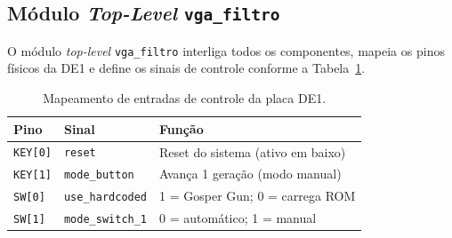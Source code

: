 \documentclass[12pt, a4paper]{article}
\begin{document}
	\subsection{Módulo \textit{Top-Level} \texttt{vga\_filtro}}
	
	O módulo \textit{top-level} \texttt{vga\_filtro} interliga todos os componentes,
	mapeia os pinos físicos da DE1 e define os sinais de controle conforme a
	Tabela~\ref{tab:controles}.
	
	\begin{table}[H]
		\centering
		\caption{Mapeamento de entradas de controle da placa DE1.}
		\label{tab:controles}
		\begin{tabular}{lll}
			\toprule
			\textbf{Pino} & \textbf{Sinal} & \textbf{Função} \\
			\midrule
			\texttt{KEY[0]} & \texttt{reset}         & Reset do sistema (ativo em baixo) \\
			\texttt{KEY[1]} & \texttt{mode\_button}  & Avança 1 geração (modo manual)    \\
			\texttt{SW[0]}  & \texttt{use\_hardcoded}& 1 = Gosper Gun; 0 = carrega ROM   \\
			\texttt{SW[1]}  & \texttt{mode\_switch\_1}& 0 = automático; 1 = manual       \\
			\bottomrule
		\end{tabular}
	\end{table}
	
\end{document}
